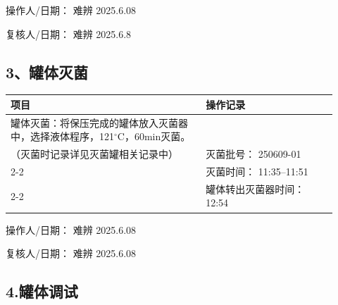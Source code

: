 \documentclass[UTF8,10pt,a4paper,fontset=fandol]{ctexart}
\newcommand{\fieldvalue}[1]{#1}
\newcommand{\handwritten}[1]{#1}
\begin{document}
\bigskip

\noindent
操作人/日期：
\fieldvalue{\handwritten{难辨}}
\qquad
\fieldvalue{\handwritten{2025.6.08}}

\noindent
复核人/日期：
\fieldvalue{\handwritten{难辨}}
\qquad
\fieldvalue{\handwritten{2025.6.8}}

\subsection*{3、罐体灭菌}

\noindent
\begin{tabular}{|p{0.55\linewidth}|p{0.37\linewidth}|}
\hline
\centering 项目 & \centering 操作记录\\
\hline
罐体灭菌：将保压完成的罐体放入灭菌器中，选择液体程序，121${}^{\circ}$C，60min灭菌。\\
（灭菌时记录详见灭菌罐相关记录中） &
灭菌批号：
\fieldvalue{\handwritten{250609-01}}\\
\cline{2-2}
& 灭菌时间：
\fieldvalue{\handwritten{11:35--11:51}}\\
\cline{2-2}
& 罐体转出灭菌器时间：
\fieldvalue{\handwritten{12:54}}\\
\hline
\end{tabular}

\noindent
操作人/日期：
\fieldvalue{\handwritten{难辨}}
\qquad
\fieldvalue{\handwritten{2025.6.08}}

\noindent
复核人/日期：
\fieldvalue{\handwritten{难辨}}
\qquad
\fieldvalue{\handwritten{2025.6.08}}

\subsection*{4.罐体调试}
\end{document}
